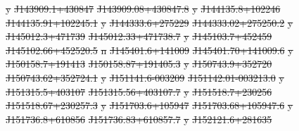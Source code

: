 \documentclass[11pt, a4paper]{book}
\providecommand{\DIFdeltex}[1]{{\protect\color{red}\sout{#1}}}                      %
\providecommand{\DIFdelFL}[1]{\DIFdel{#1}} %
\providecommand{\DIFdel}[1]{\texorpdfstring{\DIFdeltex{#1}}{}} %
\begin{document}
\DIFdelFL{y}%
\DIFdelFL{J143909.1+430847 }%
\DIFdelFL{J143909.08+430847.8 }%
\DIFdelFL{y}%
\DIFdelFL{J144135.8+102246 }%
\DIFdelFL{J144135.91+102245.1 }%
\DIFdelFL{y}%
\DIFdelFL{J144333.6+275229 }%
\DIFdelFL{J144333.02+275250.2 }%
\DIFdelFL{y}%
\DIFdelFL{J145012.3+471739 }%
\DIFdelFL{J145012.33+471738.7 }%
\DIFdelFL{y}%
\DIFdelFL{J145103.7+452459 }%
\DIFdelFL{J145102.66+452520.5 }%
\DIFdelFL{n}%
\DIFdelFL{J145401.6+141009 }%
\DIFdelFL{J145401.70+141009.6 }%
\DIFdelFL{y}%
\DIFdelFL{J150158.7+191413 }%
\DIFdelFL{J150158.87+191405.3 }%
\DIFdelFL{y}%
\DIFdelFL{J150743.9+352720 }%
\DIFdelFL{J150743.62+352724.1 }%
\DIFdelFL{y}%
\DIFdelFL{J151141.6-003209 }%
\DIFdelFL{J151142.01-003213.0 }%
\DIFdelFL{y}%
\DIFdelFL{J151315.5+403107 }%
\DIFdelFL{J151315.56+403107.7 }%
\DIFdelFL{y}%
\DIFdelFL{J151518.7+230256 }%
\DIFdelFL{J151518.67+230257.3 }%
\DIFdelFL{y}%
\DIFdelFL{J151703.6+105947 }%
\DIFdelFL{J151703.68+105947.6 }%
\DIFdelFL{y}%
\DIFdelFL{J151736.8+610856 }%
\DIFdelFL{J151736.83+610857.7 }%
\DIFdelFL{y}%
\DIFdelFL{J152121.6+281635 }%
\end{document}
